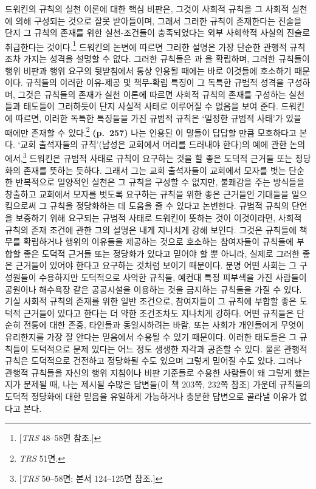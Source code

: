 드워킨의 규칙의 실천 이론에 대한 핵심 비판은, 그것이 사회적 규칙을 그
사회적 실천에 의해 구성되는 것으로 잘못 받아들이며, 그래서 그러한 규칙이
존재한다는 진술을 단지 그 규칙의 존재를 위한 실천-조건들이 충족되었다는
외부 사회학적 사실의 진술로 취급한다는 것이다.\footnote{{[}\emph{TRS}
  48--58면 참조.{]}} 드워킨의 논변에 따르면 그러한 설명은 가장 단순한
관행적 규칙조차 가지는  성격을 설명할 수 없다. 그러한
규칙들은 과 을 확립하며, 그러한
규칙들이 행위 비판과 행위 요구의 뒷받침에서 통상 인용될 때에는 바로
이것들에 호소하기 때문이다. 규칙들의 이러한 이유-제공 및 책무-확립
특징이 그 독특한 규범적 성격을 구성하며, 그것은 규칙들의 존재가 실천
이론에 따르면 사회적 규칙의 존재를 구성하는 실천들과 태도들이 그러하듯이
단지 사실적 사태로 이루어질 수 없음을 보여 준다. 드워킨에 따르면, 이러한
독특한 특징들을 가진 규범적 규칙은 ‘일정한 규범적 사태’가 있을 때에만
존재할 수 있다.\footnote{\emph{TRS} 51면.} \textbf{(p.~257)} 나는 인용된
이 말들이 답답할 만큼 모호하다고 본다. ‘교회 출석자들의 규칙’(남성은
교회에서 머리를 드러내야 한다)의 예에 관한 논의에서,\footnote{{[}\emph{TRS}
  50--58면; 본서 124--125면 참조.{]}} 드워킨은 규범적 사태로 규칙이
요구하는 것을 할 좋은 도덕적 근거들 또는 정당화의 존재를 뜻하는 듯하다.
그래서 그는 교회 출석자들이 교회에서 모자를 벗는 단순한 반복적으로
일양적인 실천은 그 규칙을 구성할 수 없지만, 불쾌감을 주는 방식들을
창출하고 교회에서 모자를 벗도록 요구하는 규칙을 위한 좋은 근거들인
기대들을 일으킴으로써 그 규칙을 정당화하는 데 도움을 줄 수 있다고
논변한다. 규범적 규칙의 단언을 보증하기 위해 요구되는 규범적 사태로
드워킨이 뜻하는 것이 이것이라면, 사회적 규칙의 존재 조건에 관한 그의
설명은 내게 지나치게 강해 보인다. 그것은 규칙들에 책무를 확립하거나
행위의 이유들을 제공하는 것으로 호소하는 참여자들이 규칙들에 부합할 좋은
도덕적 근거들 또는 정당화가 있다고 믿어야 할 뿐 아니라, 실제로 그러한
좋은 근거들이 있어야 한다고 요구하는 것처럼 보이기 때문이다. 분명 어떤
사회는 그 구성원들이 수용하지만 도덕적으로 사악한 규칙들, 예컨대 특정
피부색을 가진 사람들이 공원이나 해수욕장 같은 공공시설을 이용하는 것을
금지하는 규칙들을 가질 수 있다. 기실 사회적 규칙의 존재를 위한 일반
조건으로, 참여자들이 그 규칙에 부합할 좋은 도덕적 근거들이 있다고
 한다는 더 약한 조건조차도 지나치게 강하다. 어떤 규칙들은
단순히 전통에 대한 존중, 타인들과 동일시하려는 바람, 또는 사회가
개인들에게 무엇이 유리한지를 가장 잘 안다는 믿음에서 수용될 수 있기
때문이다. 이러한 태도들은 그 규칙들이 도덕적으로 문제 있다는 어느 정도
생생한 자각과 공존할 수 있다. 물론 관행적 규칙은 도덕적으로 건전하고
정당화될 수도 있으며 그렇게 믿어질 수도 있다. 그러나 관행적 규칙들을
자신의 행위 지침이나 비판 기준들로 수용한 사람들이 왜 그렇게 했는지가
문제될 때, 나는 제시될 수많은 답변들(이 책 203쪽, 232쪽 참조) 가운데
규칙들의 도덕적 정당화에 대한 믿음을 유일하게 가능하거나 충분한 답변으로
골라낼 이유가 없다고 본다.

